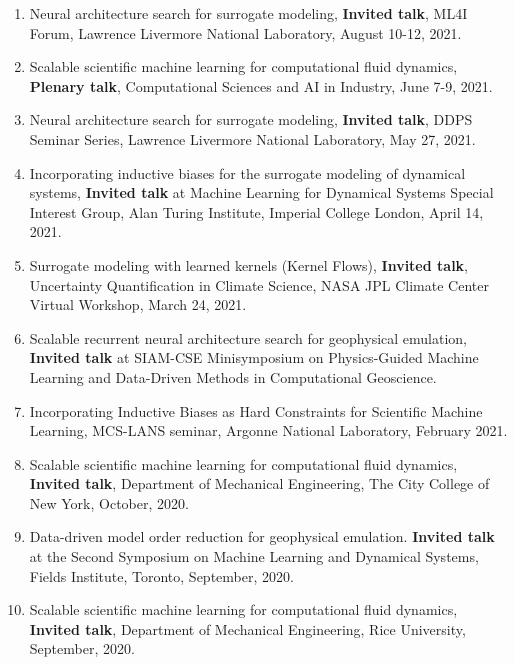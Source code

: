 \documentclass[letterpaper]{article}
\begin{document}
\begin{enumerate}
\item Neural architecture search for surrogate modeling, \textbf{Invited talk}, ML4I Forum, Lawrence Livermore National Laboratory, August 10-12, 2021.

\item Scalable scientific machine learning for computational fluid dynamics, \textbf{Plenary talk}, Computational Sciences and AI in Industry, June 7-9, 2021.

\item Neural architecture search for surrogate modeling, \textbf{Invited talk}, DDPS Seminar Series, Lawrence Livermore National Laboratory, May 27, 2021.

\item Incorporating inductive biases for the surrogate modeling of dynamical systems, \textbf{Invited talk} at Machine Learning for Dynamical Systems Special Interest Group, Alan Turing Institute, Imperial College London, April 14, 2021.

\item Surrogate modeling with learned kernels (Kernel Flows), \textbf{Invited talk}, Uncertainty Quantification in Climate Science, NASA JPL Climate Center Virtual Workshop, March 24, 2021.

\item Scalable recurrent neural architecture search for geophysical emulation, \textbf{Invited talk} at SIAM-CSE Minisymposium on Physics-Guided Machine Learning and Data-Driven Methods in Computational Geoscience.

\item Incorporating Inductive Biases as Hard Constraints for Scientific Machine Learning, MCS-LANS seminar, Argonne National Laboratory, February 2021.

\item Scalable scientific machine learning for computational fluid dynamics, \textbf{Invited talk}, Department of Mechanical Engineering, The City College of New York, October, 2020.

\item Data-driven model order reduction for geophysical emulation. \textbf{Invited talk} at the Second Symposium on Machine Learning and Dynamical Systems, Fields Institute, Toronto, September, 2020.

\item Scalable scientific machine learning for computational fluid dynamics, \textbf{Invited talk}, Department of Mechanical Engineering, Rice University, September, 2020.


\end{enumerate}
\end{document}
